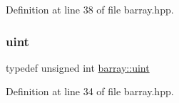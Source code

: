 Definition at line 38 of file barray.\+hpp.

\mbox{\label{namespacebarray_af9756a31953db233f80a9cfe1ef31c32}} 
\subsubsection{\texorpdfstring{uint}{uint}}
{\footnotesize\ttfamily typedef unsigned int \hyperlink{namespacebarray_af9756a31953db233f80a9cfe1ef31c32}{barray\+::uint}}



Definition at line 34 of file barray.\+hpp.

